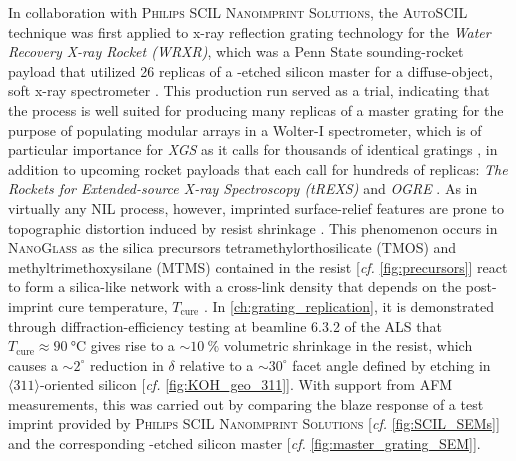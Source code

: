 In collaboration with \textsc{Philips SCIL Nanoimprint Solutions}, the \textsc{AutoSCIL} technique was first applied to x-ray reflection grating technology for the \emph{Water Recovery X-ray Rocket (WRXR)}, which was a Penn State sounding-rocket payload that utilized \num{26} replicas of a -etched silicon master for a diffuse-object, soft x-ray spectrometer \cite{Miles17,Miles18b,Miles19,Verschuuren18,Tutt19}. 
This production run served as a trial, indicating that the process is well suited for producing many replicas of a master grating for the purpose of populating modular arrays in a Wolter-I spectrometer, which is of particular importance for \emph{XGS} as it calls for thousands of identical gratings \cite{McEntaffer19}, in addition to upcoming rocket payloads that each call for hundreds of replicas: \emph{The Rockets for Extended-source X-ray Spectroscopy (tREXS)} \cite{Miles19b,Tutt19b} and \emph{OGRE} \cite{Tutt18,Donovan19a,Donovan19b}. 
As in virtually any NIL process, however, imprinted surface-relief features are prone to topographic distortion induced by resist shrinkage \cite{Horiba_2012}. 
This phenomenon occurs in \textsc{NanoGlass} as the silica precursors tetramethylorthosilicate (TMOS) and methyltrimethoxysilane (MTMS) contained in the resist [\emph{cf.\@} \cref{fig:precursors}] react to form a silica-like network with a cross-link density that depends on the post-imprint cure temperature, $T_{\text{cure}}$ \cite{Verschuuren10}. 
In \cref{ch:grating_replication}, it is demonstrated through diffraction-efficiency testing at beamline 6.3.2 of the ALS \cite{ALS_632,McCoy20b} that $T_{\text{cure}} \approx \SI{90}{\celsius}$ gives rise to a $\sim \SI{10}{\percent}$ volumetric shrinkage in the resist, which causes a $\sim 2^{\circ}$ reduction in $\delta$ relative to a $\sim 30^{\circ}$ facet angle defined by  etching in $\langle 311 \rangle$-oriented silicon [\emph{cf.\@} \cref{fig:KOH_geo_311}]. 
With support from AFM measurements, this was carried out by comparing the blaze response of a test imprint provided by \textsc{Philips SCIL Nanoimprint Solutions} [\emph{cf.\@} \cref{fig:SCIL_SEMs}] and the corresponding -etched silicon master [\emph{cf.\@} \cref{fig:master_grating_SEM}]. %

